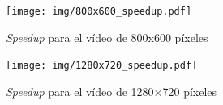 \begin{figure}[!h]

	\texttt{[image: img/800x600\_speedup.pdf]}
	\caption{\emph{Speedup} para el vídeo de 800x600 píxeles}
	\label{speedUp800}

\end{figure}

\begin{figure}[!h]

	\texttt{[image: img/1280x720\_speedup.pdf]}
	\caption{\emph{Speedup} para el vídeo de 1280$\times$720 píxeles}
	\label{speedUp1280}

\end{figure}
